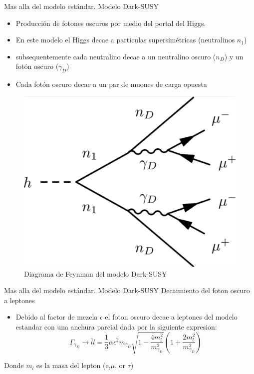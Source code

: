 \begin{frame}{Mas alla del modelo est\'andar. Modelo Dark-SUSY}
\begin{itemize}
\item Producci\'on de fotones oscuros por medio del portal del Higgs.
\item En este modelo el Higgs decae a particulas supersim\'etricas (neutralinos $n_{1}$)
\item subsequentemente cada neutralino decae a un neutralino oscuro ($n_{D}$) y un fot\'on oscuro ($\gamma_{D}$)
\item Cada fot\'on oscuro decae a un par de muones de carga opuesta\end{itemize}
\begin{figure}
\centering
\includegraphics[width=.3\textwidth]{Imag/decae.png}
\caption{Diagrama de Feynman del modelo Dark-SUSY}
\end{figure}

\end{frame}

\begin{frame}{Mas alla del modelo est\'andar. Modelo Dark-SUSY}
Decaimiento del foton oscuro a leptones
\begin{itemize}
\item Debido al factor de mezcla $\epsilon$ el foton oscuro decae a leptones del modelo estandar con una anchura parcial dada por la siguiente expresion: 
\begin{equation}
\Gamma_{\gamma_{D}}\rightarrow \bar{l}l =\frac{1}{3}\alpha\epsilon^{2}m_{\gamma_{D}}\sqrt{1-\frac{4m_{l}^{2}}{m_{\gamma_{D}}^{2}}}\left(1+\frac{2m_{l}^{2}}{m_{\gamma_{D}}^{2}}\right)
\end{equation}

\end{itemize}
Donde $m_{l}$ es la masa del lepton (e,$\mu$, or $\tau$)    
\end{frame}


